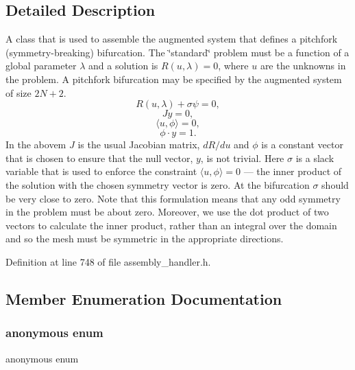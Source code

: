 \subsection{Detailed Description}
A class that is used to assemble the augmented system that defines a pitchfork (symmetry-\/breaking) bifurcation. The \char`\"{}standard\char`\"{} problem must be a function of a global parameter $ \lambda $ and a solution is $R(u,\lambda) = 0$, where $u$ are the unknowns in the problem. A pitchfork bifurcation may be specified by the augmented system of size $2N+2$. \[ R(u,\lambda) + \sigma \psi = 0,\] \[ Jy = 0,\] \[ \langle u, \phi \rangle = 0, \] \[ \phi \cdot y = 1.\] In the abovem $J$ is the usual Jacobian matrix, $dR/du$ and $\phi$ is a constant vector that is chosen to ensure that the null vector, $y$, is not trivial. Here $\sigma $ is a slack variable that is used to enforce the constraint $ \langle u, \phi \rangle = 0 $ --- the inner product of the solution with the chosen symmetry vector is zero. At the bifurcation $ \sigma $ should be very close to zero. Note that this formulation means that any odd symmetry in the problem must be about zero. Moreover, we use the dot product of two vectors to calculate the inner product, rather than an integral over the domain and so the mesh must be symmetric in the appropriate directions. 

Definition at line 748 of file assembly\+\_\+handler.\+h.



\subsection{Member Enumeration Documentation}
\mbox{\label{classoomph_1_1PitchForkHandler_a51e85b70ec1c902015024b18bdb3dacb}} 
\subsubsection{\texorpdfstring{anonymous enum}{anonymous enum}}
{\footnotesize\ttfamily anonymous enum\hspace{0.3cm}{\ttfamily [private]}}

